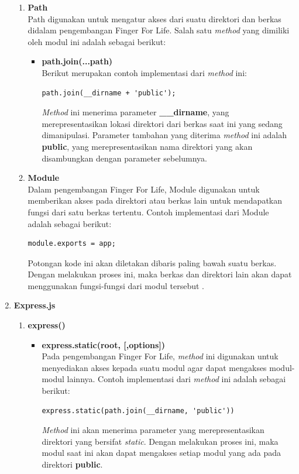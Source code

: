 \begin{enumerate}
\begin{enumerate}
		\item \textbf{Path} \\
		Path digunakan untuk mengatur akses dari suatu direktori dan berkas didalam pengembangan Finger For Life. Salah satu \textit{method} yang dimiliki oleh modul ini adalah sebagai berikut:
		
		\begin{itemize}
			\item \textbf{path.join(...path)} \\
			Berikut merupakan contoh implementasi dari \textit{method} ini:
\begin{lstlisting}[caption={contoh implementasi \textit{method join()}}]
path.join(__dirname + 'public');
\end{lstlisting} 
			
			\textit{Method} ini menerima parameter \textbf{\_\_dirname}, yang merepresentasikan lokasi direktori dari berkas saat ini yang sedang dimanipulasi. Parameter tambahan yang diterima \textit{method} ini adalah \textbf{public}, yang merepresentasikan nama direktori yang akan disambungkan dengan parameter sebelumnya.
		\end{itemize}
		
		\item \textbf{Module} \\
		Dalam pengembangan Finger For Life, Module digunakan untuk memberikan akses pada direktori atau berkas lain untuk mendapatkan fungsi dari satu berkas tertentu. Contoh implementasi dari Module adalah sebagai berikut:
\begin{lstlisting}[caption={proses \textit{export} suatu modul}]
module.exports = app;
\end{lstlisting}
Potongan kode ini akan diletakan dibaris paling bawah suatu berkas. Dengan melakukan proses ini, maka berkas dan direktori lain akan dapat menggunakan fungsi-fungsi dari modul tersebut .
	\end{enumerate}
	
	\item \textbf{Express.js}
	\begin{enumerate}
		\item \textbf{express()}
		\begin{itemize}
			\item \textbf{express.static(root, [,options])} \\
			Pada pengembangan Finger For Life, \textit{method} ini digunakan untuk menyediakan akses kepada suatu modul agar dapat mengakses modul-modul lainnya. Contoh implementasi dari \textit{method} ini adalah sebagai berikut:
\begin{lstlisting}[caption={Implementasi \textit{method} .static()}]
express.static(path.join(__dirname, 'public'))
\end{lstlisting}
			\textit{Method} ini akan menerima parameter yang merepresentasikan direktori yang bersifat \textit{static}. Dengan melakukan proses ini, maka modul saat ini akan dapat mengakses setiap modul yang ada pada direktori \textbf{public}.
			

\end{itemize}
\end{enumerate}
\end{enumerate}
